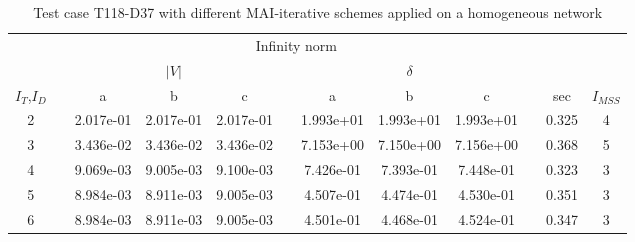 \begin{table}
\renewcommand{\arraystretch}{1.3}
\centering
\label{tab:resultsPIC3P}\hspace{2cm}\caption{Test case T118-D37 with different MAI-iterative schemes applied on a homogeneous network}
\begin{adjustbox}{width=1\textwidth} %
\small
\begin{tabular}{cccccccccccc}
\toprule
{} && \multicolumn{7}{c}{Infinity norm} && &  \\
\cmidrule{3-9}
{} && \multicolumn{3}{c}{$|V|$} && \multicolumn{3}{c}{$\delta$} && \\
\cmidrule{3-5}\cmidrule{7-9}
{$I_T$,$I_D$} &&        a &        b &       c &&        a &       b &        c && sec & $I_{MSS}$\\
\midrule
2 &&  2.017e-01 &  2.017e-01 &  2.017e-01 &&  1.993e+01 &  1.993e+01 &  1.993e+01 && 0.325 & 4 \\
3 &&  3.436e-02 &  3.436e-02 &  3.436e-02 &&  7.153e+00 &  7.150e+00 &  7.156e+00 && 0.368 & 5 \\
4 &&  9.069e-03 &  9.005e-03 &  9.100e-03 &&  7.426e-01 &  7.393e-01 &  7.448e-01 && 0.323 & 3\\
5 &&  8.984e-03 &  8.911e-03 &  9.005e-03 &&  4.507e-01 &  4.474e-01 &  4.530e-01 && 0.351 & 3\\
6 &&  8.984e-03 &  8.911e-03 &  9.005e-03 &&  4.501e-01 &  4.468e-01 &  4.524e-01 && 0.347 & 3\\
\bottomrule
\end{tabular}
\end{adjustbox}
\end{table}
